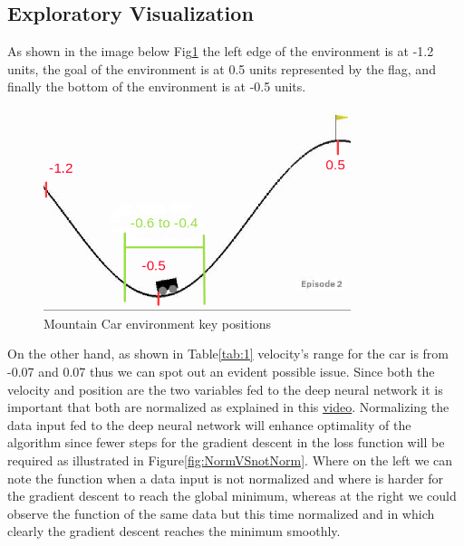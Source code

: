 \subsection{Exploratory Visualization}
\label{sub:Exploratory}

As shown in the image below Fig\ref{fig:car_not_normalized} the left edge of the environment is at -1.2 units, the goal of the environment is at 0.5 units represented by the flag, and finally the bottom of the environment is at -0.5 units.

\begin{figure}[h]
\centering
\includegraphics[width=0.8\textwidth]{env_data_visualization.png}
\caption{\label{fig:car_not_normalized} Mountain Car environment key positions}
\end{figure}

On the other hand, as shown in Table\ref{tab:1} velocity's range for the car is from -0.07 and 0.07 thus we can spot out an evident possible issue. Since both the velocity and position are the two variables fed to the deep neural network it is important that both are normalized as explained in this \href{https://www.coursera.org/lecture/deep-neural-network/normalizing-inputs-lXv6U}{video}. Normalizing the data input fed to the deep neural network will enhance optimality of the algorithm since fewer steps for the gradient descent in the loss function will be required as illustrated in Figure\ref{fig:NormVSnotNorm}. Where on the left we can note the function when a data input is not normalized and where is harder for the gradient descent to reach the global minimum, whereas at the right we could observe the function of the same data but this time normalized and in which clearly the gradient descent reaches the minimum smoothly.    

